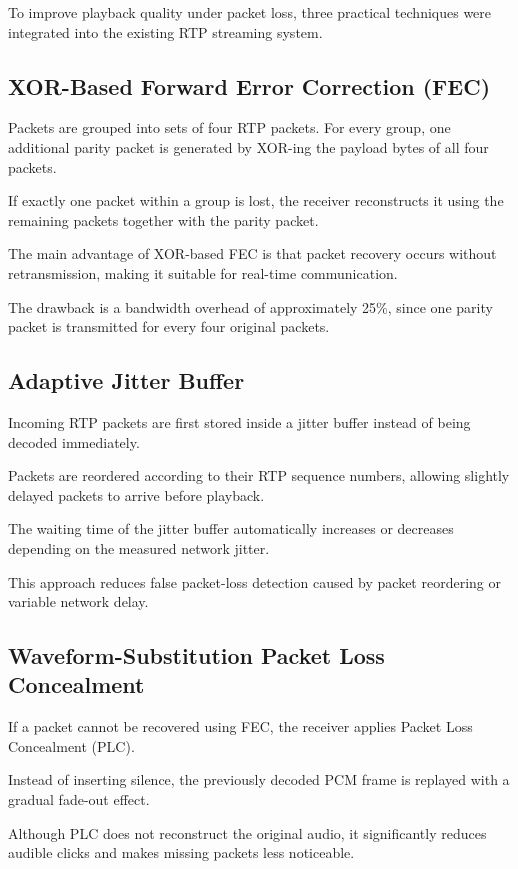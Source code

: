\documentclass[conference]{IEEEtran}
\begin{document}
To improve playback quality under packet loss, three practical techniques were integrated into the existing RTP streaming system.

\subsection{XOR-Based Forward Error Correction (FEC)}

Packets are grouped into sets of four RTP packets. For every group, one additional parity packet is generated by XOR-ing the payload bytes of all four packets.

If exactly one packet within a group is lost, the receiver reconstructs it using the remaining packets together with the parity packet.

The main advantage of XOR-based FEC is that packet recovery occurs without retransmission, making it suitable for real-time communication.

The drawback is a bandwidth overhead of approximately 25\%, since one parity packet is transmitted for every four original packets.

\subsection{Adaptive Jitter Buffer}

Incoming RTP packets are first stored inside a jitter buffer instead of being decoded immediately.

Packets are reordered according to their RTP sequence numbers, allowing slightly delayed packets to arrive before playback.

The waiting time of the jitter buffer automatically increases or decreases depending on the measured network jitter.

This approach reduces false packet-loss detection caused by packet reordering or variable network delay.

\subsection{Waveform-Substitution Packet Loss Concealment}

If a packet cannot be recovered using FEC, the receiver applies Packet Loss Concealment (PLC).

Instead of inserting silence, the previously decoded PCM frame is replayed with a gradual fade-out effect.

Although PLC does not reconstruct the original audio, it significantly reduces audible clicks and makes missing packets less noticeable.
\end{document}
